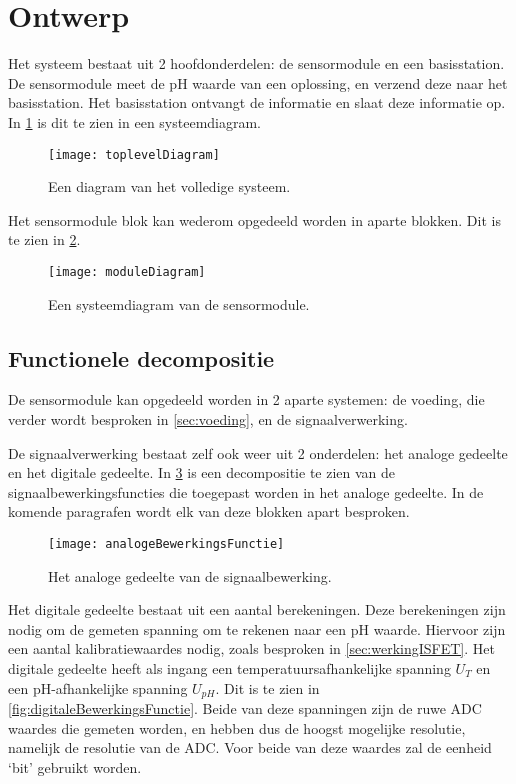 \section{Ontwerp}\label{sec:ontwerp}
Het systeem bestaat uit 2 hoofdonderdelen: de sensormodule en een basisstation. De sensormodule meet de pH waarde van een oplossing, en verzend deze naar het basisstation. Het basisstation ontvangt de informatie en slaat deze informatie op.
In \cref{fig:functional} is dit te zien in een systeemdiagram.

\begin{figure}[!htbp]
    \centering
    \texttt{[image: toplevelDiagram]}
    \caption[short]{Een diagram van het volledige systeem.}
    \label{fig:functional}
\end{figure}

Het sensormodule blok kan wederom opgedeeld worden in aparte blokken. Dit is te zien in \cref{fig:moduleDiagram}.

\begin{figure}[!htbp]
    \centering
    \texttt{[image: moduleDiagram]}
    \caption{Een systeemdiagram van de sensormodule.}
    \label{fig:moduleDiagram}
\end{figure}

\subsection{Functionele decompositie}
De sensormodule kan opgedeeld worden in 2 aparte systemen: de voeding, die verder wordt besproken in \cref{sec:voeding}, en de signaalverwerking.

De signaalverwerking bestaat zelf ook weer uit 2 onderdelen: het analoge gedeelte en het digitale gedeelte. In \cref{fig:analogeBewerkingsFunctie} is een decompositie te zien van de signaalbewerkingsfuncties die toegepast worden in het analoge gedeelte. In de komende paragrafen wordt elk van deze blokken apart besproken.

\begin{figure}[!htbp]
    \centering
    \texttt{[image: analogeBewerkingsFunctie]}
    \caption{Het analoge gedeelte van de signaalbewerking.}
    \label{fig:analogeBewerkingsFunctie}
\end{figure}


Het digitale gedeelte bestaat uit een aantal berekeningen. Deze berekeningen zijn nodig om de gemeten spanning om te rekenen naar een pH waarde. Hiervoor zijn een aantal kalibratiewaardes nodig, zoals besproken in \cref{sec:werkingISFET}. Het digitale gedeelte heeft als ingang een temperatuursafhankelijke spanning $U_T$ en een pH-afhankelijke spanning $U_{pH}$. Dit is te zien in \cref{fig:digitaleBewerkingsFunctie}. Beide van deze spanningen zijn de ruwe ADC waardes die gemeten worden, en hebben dus de hoogst mogelijke resolutie, namelijk de resolutie van de ADC. Voor beide van deze waardes zal de eenheid `bit' gebruikt worden.


